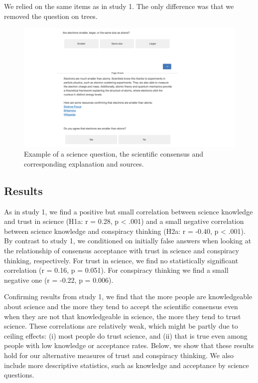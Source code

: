 \documentclass[
  doc,floatsintext]{apa6}
\begin{document}
We relied on the same items as in study 1. The only difference was that we removed the question on trees.

\FloatBarrier



\begin{figure}

\includegraphics[width=1\linewidth]{./figures/study2_question_example} \hfill{}

\caption{Example of a science question, the scientific consensus and corresponding explanation and sources.}\label{fig:exp2-stimulus-example}
\end{figure}

\subsection{Results}\label{results-2}

As in study 1, we find a positive but small correlation between science knowledge and trust in science (H1a: r = 0.28, p \textless{} .001) and a small negative correlation between science knowledge and conspiracy thinking (H2a: r = -0.40, p \textless{} .001). By contrast to study 1, we conditioned on initially false answers when looking at the relationship of consensus acceptance with trust in science and conspiracy thinking, respectively. For trust in science, we find no statistically significant correlation (r = 0.16, p = 0.051). For conspiracy thinking we find a small negative one (r = -0.22, p = 0.006).

Confirming results from study 1, we find that the more people are knowledgeable about science and the more they tend to accept the scientific consensus even when they are not that knowledgeable in science, the more they tend to trust science. These correlations are relatively weak, which might be partly due to ceiling effects: (i) most people do trust science, and (ii) that is true even among people with low knowledge or acceptance rates. Below, we show that these results hold for our alternative measures of trust and conspiracy thinking. We also include more descriptive statistics, such as knowledge and acceptance by science questions.
\end{document}
